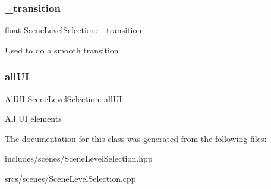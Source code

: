 \subsubsection{\texorpdfstring{\+\_\+transition}{\_transition}}
{\footnotesize\ttfamily float Scene\+Level\+Selection\+::\+\_\+transition\hspace{0.3cm}{\ttfamily [protected]}}

Used to do a smooth transition \mbox{\label{class_scene_level_selection_a99db89c89f3cafb2161cfe5c38ed9fa3}} 
\subsubsection{\texorpdfstring{all\+UI}{allUI}}
{\footnotesize\ttfamily \hyperlink{struct_scene_level_selection_1_1_all_u_i}{All\+UI} Scene\+Level\+Selection\+::all\+UI\hspace{0.3cm}{\ttfamily [protected]}}

All UI elements 

The documentation for this class was generated from the following files\+:\begin{DoxyCompactItemize}
\item 
includes/scenes/Scene\+Level\+Selection.\+hpp\item 
srcs/scenes/Scene\+Level\+Selection.\+cpp\end{DoxyCompactItemize}
